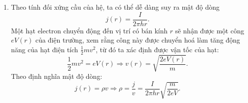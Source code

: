 \begin{enumerate}[label=\textbf{\alph*,}]\itemsep0em
\item Theo tính đối xứng cầu của hệ, ta có thể dễ dàng suy ra mật độ dòng
\begin{equation} \label{eq1_P3_d1}
    j(r) = \frac{I}{2\pi h r}.
\end{equation}
Một hạt electron chuyển động đến vị trí có bán kính $r$ sẽ nhận được một công $eV(r)$ của điện trường, xem rằng công này được chuyển hoá làm tăng động năng của hạt điện tích $\frac{1}{2}mv^2$, từ đó ta xác định được vận tốc của hạt:
\begin{equation} \label{eq2_P3_d1}
    \frac{1}{2}mv^2 = eV(r) \Rightarrow v(r)= \sqrt{ \frac{2eV(r)}{m} }.
\end{equation}
Theo định nghĩa mật độ dòng:
\begin{equation} \label{eq3_P3_d1}
    j(r) = \rho v \Rightarrow \rho = \frac{j}{v} = \frac{I}{2\pi h r} \sqrt{ \frac{m}{2eV} } .
\end{equation}


\end{enumerate}
